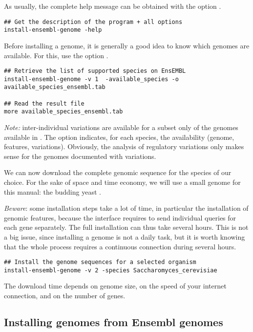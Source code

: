As usually, the complete help message can be obtained with the option
.

\begin{lstlisting}
## Get the description of the program + all options
install-ensembl-genome -help
\end{lstlisting}

Before installing a genome, it is generally a good idea to know which
genomes are available. For this, use the option
.

\begin{lstlisting}
## Retrieve the list of supported species on EnsEMBL
install-ensembl-genome -v 1  -available_species -o available_species_ensembl.tab

## Read the result file
more available_species_ensembl.tab
\end{lstlisting}

\emph{Note:} inter-individual variations are available for a subset
only of the genomes available in \ensembl. The option
 indicates, for each species, the
availability (genome, features, variations). Obviously, the analysis
of regulatory variations only makes sense for the genomes documented
with variations.

We can now download the complete genomic sequence for the species of
our choice. For the sake of space and time economy, we will use a
small genome for this manual: the budding yeast . 

\emph{Beware}: some installation steps take a lot of time, in
particular the installation of genomic features, because the \ensembl
interface requires to send individual queries for each gene
separately. The full installation can thus take several hours. This is
not a big issue, since installing a genome is not a daily task, but it
is worth knowing that the whole process requires a continuous
connection during several hours.

\begin{lstlisting}
## Install the genome sequences for a selected organism
install-ensembl-genome -v 2 -species Saccharomyces_cerevisiae
\end{lstlisting}

The download time depends on genome size, on the speed of your
internet connection, and on the number of genes.

\subsection{Installing genomes from Ensembl genomes}

